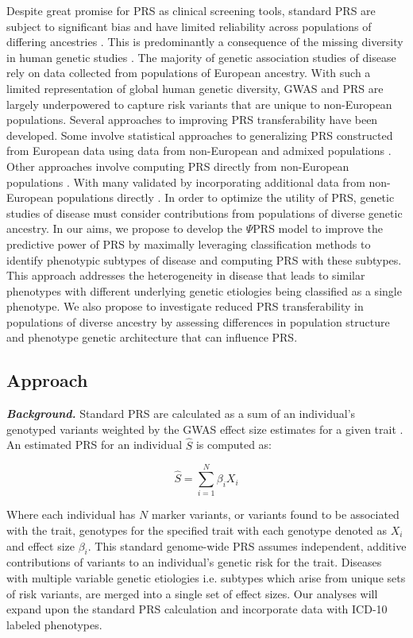 \documentclass[11pt]{article}  %
\begin{document}
Despite great promise for PRS as clinical screening tools, standard PRS are subject to significant bias and have limited reliability across populations of differing ancestries \cite{majara_low_2021}. This is predominantly a consequence of the missing diversity in human genetic studies \cite{sirugo_missing_2019}. The majority of genetic association studies of disease rely on data collected from populations of European ancestry. With such a limited representation of global human genetic diversity, GWAS and PRS are largely underpowered to capture risk variants that are unique to non-European populations. Several approaches to improving PRS transferability have been developed. Some involve statistical approaches to generalizing PRS constructed from European data using data from non-European and admixed populations \cite{grinde_generalizing_2019}. Other approaches involve computing PRS directly from non-European populations \cite{martin_critical_2018}. With many validated by incorporating additional data from non-European populations directly \cite{cavazos_inclusion_2021}. In order to optimize the utility of PRS, genetic studies of disease must consider contributions from populations of diverse genetic ancestry. 
In our aims, we propose to develop the $\Psi$PRS model to improve the predictive power of PRS by maximally leveraging classification methods to identify phenotypic subtypes of disease and computing PRS with these subtypes. This approach addresses the heterogeneity in disease that leads to similar phenotypes with different underlying genetic etiologies being classified as a single phenotype. We also propose to investigate reduced PRS transferability in populations of diverse ancestry by assessing differences in population structure and phenotype genetic architecture that can influence PRS. 





\subsection*{Approach}

\textbf{\textit{Background.}} Standard PRS are calculated as a sum of an individual's genotyped variants weighted by the GWAS effect size estimates for a given trait \cite{choi_tutorial_2020}. An estimated PRS for an individual $\hat{S}$ is computed as:

$$
\hat{S} = \sum_{i=1}^{N} \beta_i X_i
$$

Where each individual has $N$ marker variants, or variants found to be associated with the trait, genotypes for the specified trait with each genotype denoted as $X_i$ and effect size $\beta_i$. This standard genome-wide PRS assumes independent, additive contributions of variants to an individual's genetic risk for the trait. Diseases with multiple variable genetic etiologies i.e. subtypes which arise from unique sets of risk variants, are merged into a single set of effect sizes. Our analyses will expand upon the standard PRS calculation and incorporate data with ICD-10 labeled phenotypes. 
\end{document}

